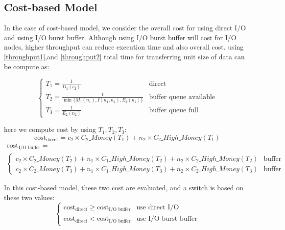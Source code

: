 \subsection{Cost-based Model}
In the case of cost-based model, we consider the overall cost for using direct I/O and using I/O burst buffer. Although using I/O burst buffer will cost for I/O nodes, higher throughput can reduce execution time and also overall cost.
using \ref{throughput1},and \ref{throughput2} total time for transferring unit size of data can be compute as:

\begin{equation}
	\begin{cases}
		T_1=\frac{1}{D_1(c_2)} & \text{direct}\\
		T_2=\frac{1}{\min\{M_1(n_1),I(n_1,n_2),E_2(n_2)\}} &\text{buffer queue available}\\
		T_3=\frac{1}{E_2(n_2)} &\text{buffer queue full}
	\end{cases}
\end{equation}

here we compute cost by using $T_1,T_2,T_3$:
\begin{equation}
	\text{cost}_\text{direct}=c_2\times C_2\_Money(T_1)+n_2\times C_2\_High\_Money(T_1)
\end{equation}
\begin{align}
	\text{cost}_\text{I/O buffer}=\\\begin{cases}
				c_2\times C_2\_Money(T_2)+n_1\times C_1\_High\_Money(T_2)+n_2\times C_2\_High\_Money(T_2)&\text{buffer queue available}\\
				c_2\times C_2\_Money(T_3)+n_1\times C_1\_High\_Money(T_3)+n_2\times C_2\_High\_Money(T_3) &\text{buffer queue full}
\end{cases}
\end{align}

In this cost-based model, these two cost are evaluated, and a switch is based on these two values:
\begin{equation}
	\begin{cases}
		\text{cost}_{\text{direct}} \geq \text{cost}_{\text{I/O buffer}} & \text{use direct I/O}\\
		\text{cost}_{\text{direct}} < \text{cost}_{\text{I/O buffer}} & \text{use I/O burst buffer}
	\end{cases}
\end{equation}

